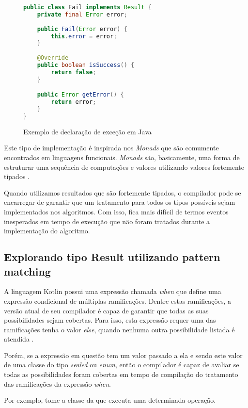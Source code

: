 \begin{figure}[H]
    \centering
    \begin{lstlisting}[language=Java]
public class Fail implements Result {
    private final Error error;
    
    public Fail(Error error) {
        this.error = error;
    }
    
    @Override
    public boolean isSuccess() {
        return false;
    }

    public Error getError() {
        return error;
    }
}
    \end{lstlisting}
    \caption{Exemplo de declaração de exceção em Java}
    \label{fig:java_fail_result_implementation}
\end{figure}

Este tipo de implementação é inspirada nos \textit{Monads} que são comumente encontrados em linguagens funcionais. \textit{Monads} são, basicamente, uma forma de estruturar uma sequência de computações e valores utilizando valores fortemente tipados \cite{haskell_monads}.

Quando utilizamos resultados que são fortemente tipados, o compilador pode se encarregar de garantir que um tratamento para todos os tipos possíveis sejam implementados nos algoritmos. Com isso, fica mais difícil de termos eventos inesperados em tempo de execução que não foram tratados durante a implementação do algoritmo.

\subsection{Explorando tipo Result utilizando pattern matching}

A linguagem Kotlin possui uma expressão chamada \textit{when} que define uma expressão condicional de múltiplas ramificações. Dentre estas ramificações, a versão atual de seu compilador é capaz de garantir que todas as suas possibilidades sejam cobertas. Para isso, esta expressão requer uma das ramificações tenha o valor \textit{else}, quando nenhuma outra possibilidade listada é atendida \cite{kotlin_when_expression}.

Porém, se a expressão em questão tem um valor passado a ela e sendo este valor de uma classe do tipo \textit{sealed} ou \textit{enum}, então o compilador é capaz de avaliar se todas as possibilidades foram cobertas em tempo de compilação do tratamento das ramificações da expressão \textit{when}.

Por exemplo, tome a classe da  que executa uma determinada operação.

